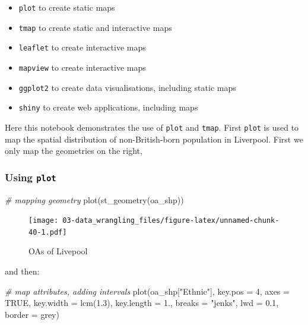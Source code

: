 \documentclass[
]{book}
\newenvironment{Shaded}{\begin{snugshade}}{\end{snugshade}}
\newcommand{\AttributeTok}[1]{\textcolor[rgb]{0.77,0.63,0.00}{#1}}
\newcommand{\CommentTok}[1]{\textcolor[rgb]{0.56,0.35,0.01}{\textit{#1}}}
\newcommand{\ConstantTok}[1]{\textcolor[rgb]{0.00,0.00,0.00}{#1}}
\newcommand{\DecValTok}[1]{\textcolor[rgb]{0.00,0.00,0.81}{#1}}
\newcommand{\FloatTok}[1]{\textcolor[rgb]{0.00,0.00,0.81}{#1}}
\newcommand{\FunctionTok}[1]{\textcolor[rgb]{0.00,0.00,0.00}{#1}}
\newcommand{\NormalTok}[1]{#1}
\newcommand{\StringTok}[1]{\textcolor[rgb]{0.31,0.60,0.02}{#1}}
\providecommand{\tightlist}{%
  \setlength{\itemsep}{0pt}\setlength{\parskip}{0pt}}
\begin{document}
\begin{itemize}
\tightlist
\item
  \texttt{plot} to create static maps
\item
  \texttt{tmap} to create static and interactive maps
\item
  \texttt{leaflet} to create interactive maps
\item
  \texttt{mapview} to create interactive maps
\item
  \texttt{ggplot2} to create data visualisations, including static maps
\item
  \texttt{shiny} to create web applications, including maps
\end{itemize}

Here this notebook demonstrates the use of \texttt{plot} and \texttt{tmap}. First \texttt{plot} is used to map the spatial distribution of non-British-born population in Liverpool. First we only map the geometries on the right,

\hypertarget{using-plot}{%
\subsubsection{\texorpdfstring{Using \texttt{plot}}{Using plot}}\label{using-plot}}

\begin{Shaded}
\begin{Highlighting}[]
\CommentTok{\# mapping geometry}
\FunctionTok{plot}\NormalTok{(}\FunctionTok{st\_geometry}\NormalTok{(oa\_shp))}
\end{Highlighting}
\end{Shaded}

\begin{figure}
\centering
\texttt{[image: 03-data\_wrangling\_files/figure-latex/unnamed-chunk-40-1.pdf]}
\caption{\label{fig:unnamed-chunk-40}OAs of Livepool}
\end{figure}

and then:

\begin{Shaded}
\begin{Highlighting}[]
\CommentTok{\# map attributes, adding intervals}
\FunctionTok{plot}\NormalTok{(oa\_shp[}\StringTok{"Ethnic"}\NormalTok{], }\AttributeTok{key.pos =} \DecValTok{4}\NormalTok{, }\AttributeTok{axes =} \ConstantTok{TRUE}\NormalTok{, }\AttributeTok{key.width =} \FunctionTok{lcm}\NormalTok{(}\FloatTok{1.3}\NormalTok{), }\AttributeTok{key.length =} \FloatTok{1.}\NormalTok{,}
     \AttributeTok{breaks =} \StringTok{"jenks"}\NormalTok{, }\AttributeTok{lwd =} \FloatTok{0.1}\NormalTok{, }\AttributeTok{border =} \StringTok{\textquotesingle{}grey\textquotesingle{}}\NormalTok{) }
\end{Highlighting}
\end{Shaded}
\end{document}
